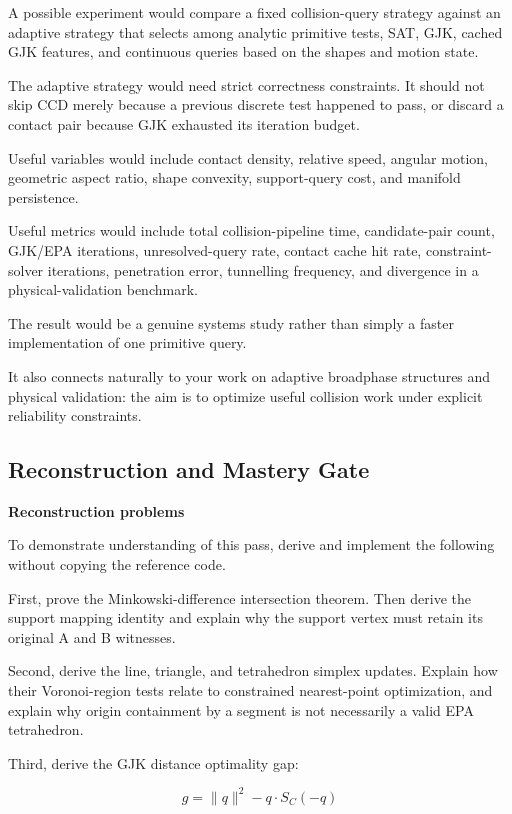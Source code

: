 A possible experiment would compare a fixed collision-query strategy against an adaptive strategy that selects among analytic primitive tests, SAT, GJK, cached GJK features, and continuous queries based on the shapes and motion state.

The adaptive strategy would need strict correctness constraints. It should not skip CCD merely because a previous discrete test happened to pass, or discard a contact pair because GJK exhausted its iteration budget.

Useful variables would include contact density, relative speed, angular motion, geometric aspect ratio, shape convexity, support-query cost, and manifold persistence.

Useful metrics would include total collision-pipeline time, candidate-pair count, GJK/EPA iterations, unresolved-query rate, contact cache hit rate, constraint-solver iterations, penetration error, tunnelling frequency, and divergence in a physical-validation benchmark.

The result would be a genuine systems study rather than simply a faster implementation of one primitive query.

It also connects naturally to your work on adaptive broadphase structures and physical validation: the aim is to optimize useful collision work under explicit reliability constraints.

\subsection{Reconstruction and Mastery Gate}\label{04-visual-computing-ii-ch026-reconstruction-and-mastery-gate}

\textbf{Reconstruction problems}

To demonstrate understanding of this pass, derive and implement the following without copying the reference code.

First, prove the Minkowski-difference intersection theorem. Then derive the support mapping identity and explain why the support vertex must retain its original A and B witnesses.

Second, derive the line, triangle, and tetrahedron simplex updates. Explain how their Voronoi-region tests relate to constrained nearest-point optimization, and explain why origin containment by a segment is not necessarily a valid EPA tetrahedron.

Third, derive the GJK distance optimality gap:

\[
g=\|q\|^2-q\cdot S_C(-q)
\]

